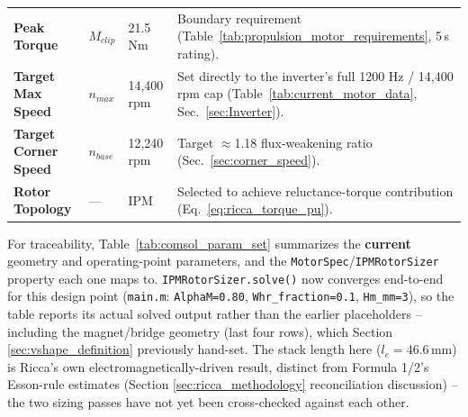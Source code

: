 \documentclass[11pt,a4paper]{article}
\begin{document}
\begin{center}
\begin{longtable}{p{2.6cm} p{1.1cm} p{2.7cm} p{8.2cm}}
\textbf{Peak Torque} & $M_{clip}$ & 21.5 Nm & Boundary requirement (Table~\ref{tab:propulsion_motor_requirements}, 5\,s rating).\\
\textbf{Target Max Speed} & $n_{max}$ & 14,400 rpm & Set directly to the inverter's full 1200 Hz / 14,400 rpm cap (Table~\ref{tab:current_motor_data}, Sec.~\ref{sec:Inverter}). \\
\textbf{Target Corner Speed} & $n_{base}$ & 12,240 rpm & Target $\approx$1.18 flux-weakening ratio (Sec.~\ref{sec:corner_speed}). \\
\textbf{Rotor Topology} & --- & IPM & Selected to achieve reluctance-torque contribution (Eq.~\ref{eq:ricca_torque_pu}). \\
\end{longtable}
\end{center}

For traceability, Table~\ref{tab:comsol_param_set} summarizes the \textbf{current} geometry and operating-point parameters, and the \texttt{MotorSpec}/\texttt{IPMRotorSizer} property each one maps to. \texttt{IPMRotorSizer.solve()} now converges end-to-end for this design point (\texttt{main.m}: \texttt{AlphaM=0.80}, \texttt{Whr\_fraction=0.1}, \texttt{Hm\_mm=3}), so the table reports its actual solved output rather than the earlier placeholders -- including the magnet/bridge geometry (last four rows), which Section \ref{sec:vshape_definition} previously hand-set. The stack length here ($l_e=46.6$\,mm) is Ricca's own electromagnetically-driven result, distinct from Formula 1/2's Esson-rule estimates (Section \ref{sec:ricca_methodology} reconciliation discussion) -- the two sizing passes have not yet been cross-checked against each other.
\end{document}
